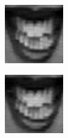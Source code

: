\begin{figure}
\begin{subfigure}[b]{0.15\textwidth}
		\caption{}
		\label{fig:timeseriesHappy:j}
	\end{subfigure}
	\begin{subfigure}[b]{0.15\textwidth}
		\includegraphics[width=\textwidth]{./img/timeseriesHappy/S026_006_00000011.png}
		\caption{}
		\label{fig:timeseriesHappy:k}
	\end{subfigure}
	\begin{subfigure}[b]{0.15\textwidth}
		\includegraphics[width=\textwidth]{./img/timeseriesHappy/S026_006_00000012.png}

\end{subfigure}
\end{figure}
